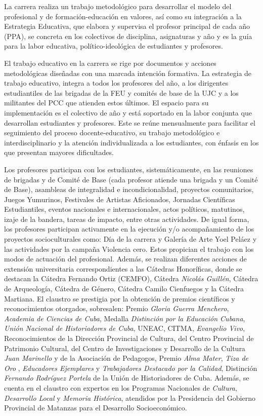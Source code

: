 La carrera realiza un trabajo metodológico para desarrollar el modelo del profesional y de formación-educación en valores, así como su integración a la Estrategia Educativa, que elabora y supervisa el profesor principal de cada año (PPA), se concreta en los colectivos de disciplina, asignaturas y año y es la guía para la labor educativa, político-ideológica de estudiantes y profesores. 

El trabajo educativo en la carrera se rige por documentos y acciones metodológicas diseñadas con una marcada intención formativa. La estrategia de trabajo educativo, integra a todos los profesores del año, a los dirigentes estudiantiles de las brigadas de la FEU y comités de base de la UJC y a los militantes del PCC que atienden estos últimos. El espacio para su implementación es el colectivo de año y está soportado en la labor conjunta que desarrollan estudiantes y profesores. Este se reúne mensualmente para facilitar el seguimiento del proceso docente-educativo, su trabajo metodológico e interdisciplinario y la atención individualizada a los estudiantes, con énfasis en los que presentan mayores dificultades. 

Los profesores participan con los estudiantes, sistemáticamente, en las reuniones de brigadas y de Comité de Base (cada profesor atiende una brigada y un Comité de Base), asambleas de integralidad e incondicionalidad, proyectos comunitarios, Juegos Yumurinos, Festivales de Artistas Aficionados, Jornadas Científicas Estudiantiles, eventos nacionales e internacionales, actos políticos, matutinos, izaje de la bandera, tareas de impacto, entre otras actividades. De igual forma, los profesores participan activamente en la ejecución y/o acompañamiento de los proyectos socioculturales como: Día de la carrera y Galería de Arte Yoel Peláez y las actividades por la campaña Violencia cero. Estos propician el trabajo con los modos de actuación del profesional. Además, se realizan diferentes acciones de extensión universitaria correspondientes a las Cátedras Honoríficas, donde se destacan la Cátedra Fernando Ortiz (CEMFO), Cátedra \emph{Nicolás Guillén}, Cátedra de Arqueología, Cátedra de Género, Cátedra Camilo Cienfuegos y la Cátedra Martiana.
El claustro se prestigia por la obtención de premios científicos y reconocimientos otorgados, sobresalen: Premio \emph{Gloria Guerra Menchero}, \emph{Academia de Ciencias de Cuba}, Medalla \emph{Distinción por la Educación Cubana}, \emph{Unión Nacional de Historiadores de Cuba}, UNEAC, CITMA, \emph{Evangelio Vivo}, Reconocimientos de la Dirección Provincial de Cultura, del Centro Provincial de Patrimonio Cultural, del  Centro de Investigaciones y Desarrollo de la Cultura \emph{Juan Marinello} y de la Asociación de Pedagogos, Premio \emph{Alma Mater}, \emph{Tiza de Oro} , \emph{Educadores Ejemplares} y \emph{Trabajadores Destacado por la Calidad}, Distinción \emph{Fernando Rodríguez Portela} de la Unión de Historiadores de Cuba. Además, se cuenta en el claustro con expertos en los Programas Nacionales de \emph{Cultura}, \emph{Desarrollo Local} y \emph{Memoria Histórica}, atendidos por la Presidencia del Gobierno Provincial de Matanzas para el Desarrollo Socioeconómico. 

